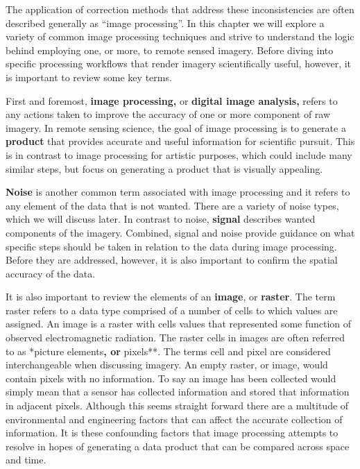 \documentclass[
]{book}
\begin{document}
The application of correction methods that address these inconsistencies
are often described generally as ``image processing''. In this chapter we
will explore a variety of common image processing techniques and strive
to understand the logic behind employing one, or more, to remote sensed
imagery. Before diving into specific processing workflows that render
imagery scientifically useful, however, it is important to review some
key terms.

First and foremost, \textbf{image processing,} or \textbf{digital image analysis,}
refers to any actions taken to improve the accuracy of one or more
component of raw imagery. In remote sensing science, the goal of image
processing is to generate a \textbf{product} that provides accurate and useful
information for scientific pursuit. This is in contrast to image
processing for artistic purposes, which could include many similar
steps, but focus on generating a product that is visually appealing.

\textbf{Noise} is another common term associated with image processing and it
refers to any element of the data that is not wanted. There are a
variety of noise types, which we will discuss later. In contrast to
noise, \textbf{signal} describes wanted components of the imagery. Combined,
signal and noise provide guidance on what specific steps should be taken
in relation to the data during image processing. Before they are
addressed, however, it is also important to confirm the spatial accuracy
of the data.

It is also important to review the elements of an \textbf{image}, or \textbf{raster}.
The term raster refers to a data type comprised of a number of cells to
which values are assigned. An image is a raster with cells values that
represented some function of observed electromagnetic radiation. The
raster cells in images are often referred to as *picture elements\textbf{, or
}pixels**. The terms cell and pixel are considered interchangeable when
discussing imagery. An empty raster, or image, would contain pixels with
no information. To say an image has been collected would simply mean
that a sensor has collected information and stored that information in
adjacent pixels. Although this seems straight forward there are a
multitude of environmental and engineering factors that can affect the
accurate collection of information. It is these confounding factors that
image processing attempts to resolve in hopes of generating a data
product that can be compared across space and time.
\end{document}
